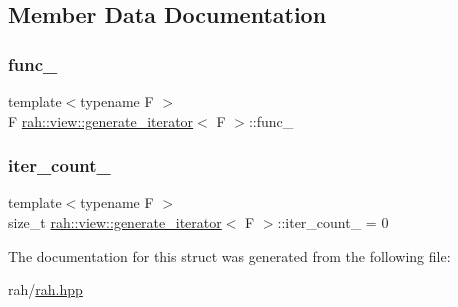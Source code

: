 \subsection{Member Data Documentation}
\mbox{\label{structrah_1_1view_1_1generate__iterator_a72f19774c5fddd0a04a293bd08dce1cd}} 
\subsubsection{\texorpdfstring{func\_}{func\_}}
{\footnotesize\ttfamily template$<$typename F $>$ \\
F \mbox{\hyperlink{structrah_1_1view_1_1generate__iterator}{rah\+::view\+::generate\+\_\+iterator}}$<$ F $>$\+::func\+\_\+\hspace{0.3cm}{\ttfamily [mutable]}}

\mbox{\label{structrah_1_1view_1_1generate__iterator_a66d7843d9aefee7179023c5c13fa05c1}} 
\subsubsection{\texorpdfstring{iter\_count\_}{iter\_count\_}}
{\footnotesize\ttfamily template$<$typename F $>$ \\
size\+\_\+t \mbox{\hyperlink{structrah_1_1view_1_1generate__iterator}{rah\+::view\+::generate\+\_\+iterator}}$<$ F $>$\+::iter\+\_\+count\+\_\+ = 0}



The documentation for this struct was generated from the following file\+:\begin{DoxyCompactItemize}
\item 
rah/\mbox{\hyperlink{rah_8hpp}{rah.\+hpp}}\end{DoxyCompactItemize}
